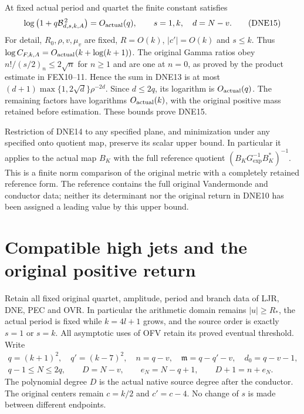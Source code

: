 \documentclass[11pt,a4paper]{article}
\begin{document}
At fixed actual period and quartet the finite constant satisfies
\[
 \log\left(1+q\mathcal B_{d,s,k,A}^{\,2}\right)
       =O_{\rm actual}(q),\qquad s=1,k,\quad d=N-v.
 \tag{DNE15}
\]
For detail, $R_0,\rho,v,\mu_v$ are fixed, $R=O(k)$,
$|c'|=O(k)$ and $s\le k$. Thus
$\log C_{F,k,A}=O_{\rm actual}(k+\log(k+1))$.
The original Gamma ratios obey
$n!/(s/2)_n\le2\sqrt n$ for $n\ge1$ and are one at $n=0$,
as proved by the product estimate in FEX10--11. Hence the
sum in DNE13 is at most
$(d+1)\max\{1,2\sqrt d\}\rho^{-2d}$.
Since $d\le2q$, its logarithm is $O_{\rm actual}(q)$.
The remaining factors have logarithms $O_{\rm actual}(k)$,
with the original positive mass retained before estimation.
These bounds prove DNE15.

Restriction of DNE14 to any specified plane, and minimization
under any specified onto quotient map, preserve its scalar
upper bound. In particular it applies to the actual map $B_K$
with the full reference quotient
$(B_KG_{\exp}^{-1}B_K^*)^{-1}$.
This is a finite norm comparison of the original metric
with a completely retained reference form. The reference
contains the full original Vandermonde and conductor data;
neither its determinant nor the original return in DNE10
has been assigned a leading value by this upper bound.



\clearpage
\section{Compatible high jets and the original positive return}
\label{sec:HJR}

Retain all fixed original quartet, amplitude, period and branch data
of LJR, DNE, PEC and OVR. In particular the arithmetic domain remains
$|u|\ge R_*$, the actual period is fixed while $k=4l+1$ grows, and
the source order is exactly $s=1$ or $s=k$. All asymptotic uses of
OFV retain its proved eventual threshold. Write
\[
 \begin{gathered}
 q=(k+1)^2,\quad q'=(k-7)^2,\quad
 n=q-v,\quad \mathfrak m=q-q'-v,\quad d_0=q-v-1,\\
 q-1\le N\le2q,\qquad D=N-v,\qquad
 e_N=N-q+1,\qquad D+1=n+e_N.
 \end{gathered}\tag{HJR1}
\]
The polynomial degree $D$ is the actual native source degree after
the conductor. The original centers remain $c=k/2$ and $c'=c-4$.
No change of $s$ is made between different endpoints.
\end{document}
